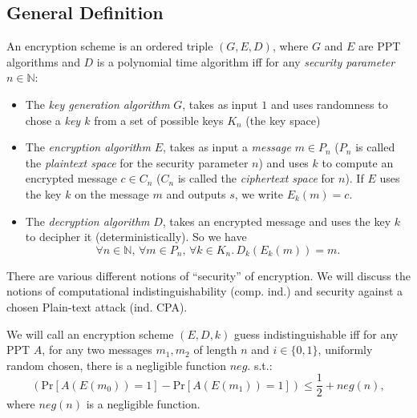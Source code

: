 \subsection{General Definition}

\begin{definition}
 An encryption scheme is an ordered triple $(G, E, D)$, where $G$ and $E$ are PPT algorithms and $D$ is a polynomial time algorithm iff for any \emph{security parameter} $n\in\mathbb{N}$:
 \begin{itemize}
  \item The \emph{key generation algorithm} $G$, takes as input $1$ and uses randomness to chose a \emph{key $k$} from a set of possible keys $K_n$ (the key space)
  \item The \emph{encryption algorithm} $E$, takes as input a \emph{message} $m\in P_n$ ($P_n$ is called the \emph{plaintext space} for the security parameter $n$) and uses $k$ to compute an encrypted message $c\in C_n$ ($C_n$ is called the \emph{ciphertext space} for $n$). If $E$ uses the key $k$ on the message $m$ and outputs $s$, we write $E_k(m)=c$.
  \item The \emph{decryption algorithm} $D$, takes an encrypted message and uses the key $k$ to decipher it (deterministically). So we have $$\forall n\in\mathbb{N},\,\forall m\in P_n,\,\forall k \in K_n.\,D_k(E_k(m))=m.$$
 \end{itemize}
\end{definition}

There are various different notions of ``security'' of encryption. We will discuss the notions of %
computational indistinguishability (comp. ind.) and security against a chosen Plain-text attack (ind. CPA). 
\begin{definition}
 We will call an encryption scheme $(E,D,k)$ guess indistinguishable iff for any PPT $A$, for any two messages $m_1, m_2$ of length $n$ and $i\in \{0,1\}$, uniformly random chosen, there is a negligible function $neg.$ s.t.:
 \[(\mathrm{Pr}\left[A(E(m_0))=1\right]-\mathrm{Pr}\left[A(E(m_1))=1\right])\leq \frac{1}{2}+neg(n), \] where $neg(n)$ is a negligible function.
\end{definition}

